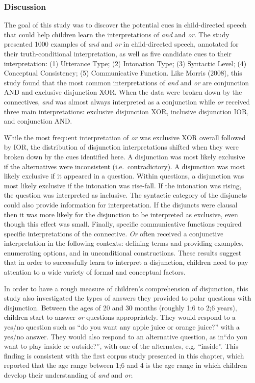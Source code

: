 \documentclass[floatsintext,man]{apa6}
\theoremstyle{definition}
\theoremstyle{definition}
\theoremstyle{definition}
\theoremstyle{remark}
\begin{document}
\subsubsection{Discussion}\label{discussion}

The goal of this study was to discover the potential cues in
child-directed speech that could help children learn the interpretations
of \emph{and} and \emph{or}. The study presented 1000 examples of
\emph{and} and \emph{or} in child-directed speech, annotated for their
truth-conditional interpretation, as well as five candidate cues to
their interpretation: (1) Utterance Type; (2) Intonation Type; (3)
Syntactic Level; (4) Conceptual Consistency; (5) Communicative Function.
Like Morris (2008), this study found that the most common
interpretations of \emph{and} and \emph{or} are conjunction AND and
exclusive disjunction XOR. When the data were broken down by the
connectives, \emph{and} was almost always interpreted as a conjunction
while \emph{or} received three main interpretations: exclusive
disjunction XOR, inclusive disjunction IOR, and conjunction AND.

While the most frequent interpretation of \emph{or} was exclusive XOR
overall followed by IOR, the distribution of disjunction interpretations
shifted when they were broken down by the cues identified here. A
disjunction was most likely exclusive if the alternatives were
inconsistent (i.e.~contradictory). A disjunction was most likely
exclusive if it appeared in a question. Within questions, a disjunction
was most likely exclusive if the intonation was rise-fall. If the
intonation was rising, the question was interpreted as inclusive. The
syntactic category of the disjuncts could also provide information for
interpretation. If the disjuncts were clausal then it was more likely
for the disjunction to be interpreted as exclusive, even though this
effect was small. Finally, specific communicative functions required
specific interpretations of the connective. \emph{Or} often received a
conjunctive interpretation in the following contexts: defining terms and
providing examples, enumerating options, and in unconditional
constructions. These results suggest that in order to successfully learn
to interpret a disjunction, children need to pay attention to a wide
variety of formal and conceptual factors.

In order to have a rough measure of children's comprehension of
disjunction, this study also investigated the types of answers they
provided to polar questions with disjunction. Between the ages of 20 and
30 months (roughly 1;6 to 2;6 years), children start to answer \emph{or}
questions appropriately. They would respond to a yes/no question such as
\enquote{do you want any apple juice or orange juice?} with a yes/no
answer. They would also respond to an alternative question, as
in\enquote{do you want to play inside or outside?}, with one of the
alternates, e.g. \enquote{inside}. This finding is consistent with the
first corpus study presented in this chapter, which reported that the
age range between 1;6 and 4 is the age range in which children develop
their understanding of \emph{and} and \emph{or}.
\end{document}
